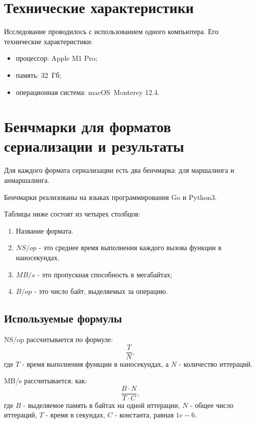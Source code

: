 \clearpage

\section{Технические характеристики}
Исследование проводилось с использованием одного компьютера.
Его технические характеристики:
\begin{itemize}
	\item процессор: Apple M1 Pro;
	\item память: 32~Гб;
	\item операционная система: macOS~Monterey \cite{monterey} 12.4.
\end{itemize}

\section{Бенчмарки для форматов сериализации и результаты}

Для каждого формата сериализации есть два бенчмарка: для маршалинга и анмаршалинга.

Бенчмарки реализованы на языках программирования Go и Python3.  

Таблицы ниже состоят из четырех столбцов:
\begin{enumerate}
\item Название формата.
\item $NS/op$ - это среднее время выполнения каждого вызова функции в наносекундах.
\item $MB/s$ - это пропускная способность в мегабайтах;
\item $B/op$ - это число байт, выделяемых за операцию.
\end{enumerate}
\clearpage

\subsection{Используемые формулы}
NS/op рассчитывается по формуле:
\begin{equation}
\frac{T}{N},
\end{equation}
где $T$ - время выполнения функции в наносекундах, а $N$ - количество иттераций.


MB/s рассчитывается, как:
\begin{equation}
\frac{B \cdot N}{T \cdot C},
\end{equation}
где $B$ - выделяемое память в байтах на одной иттерации, $N$ - общее число иттераций, $T$ - время в секундах, $C$ - константа, равная $1e-6$.

